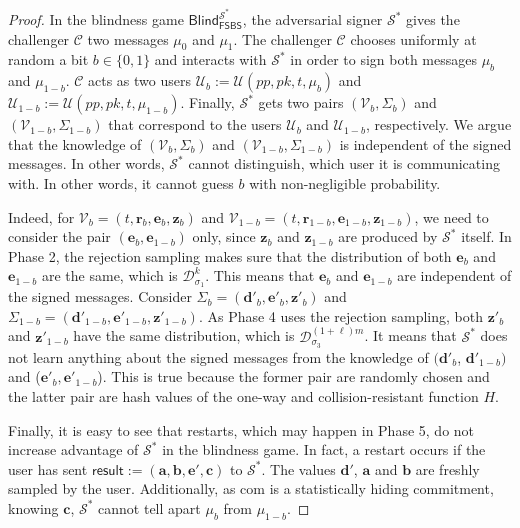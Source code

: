 \documentclass[runningheads]{llncs}
\def\bf{\mathbf}
\begin{document}
\begin{proof} 
In the blindness game $\textsf{Blind}_{\textsf{FSBS}}^{\mathcal{S}^*}$, 
the adversarial signer $\mathcal{S}^*$ gives  the challenger $\mathcal{C}$ two messages $\mu_0$ and  $\mu_1$. 
The challenger $\mathcal{C}$ chooses uniformly at random a bit $b \in \{0, 1\}$ and 
interacts with $\mathcal{S}^*$ in order to sign both messages $\mu_b$ and $\mu_{1-b}$. 
$\mathcal{C}$ acts as two users $\mathcal{U}_b:=\mathcal{U}(pp, pk,t, \mu_b)$ 
and $\mathcal{U}_{1-b}:=\mathcal{U}(pp, pk,t, \mu_{1-b})$. 
Finally, $\mathcal{S}^*$ gets
two pairs $(\mathcal{V}_b,\Sigma_b)$ and $(\mathcal{V}_{1-b},\Sigma_{1-b})$
that correspond to the users $\mathcal{U}_b$ and $\mathcal{U}_{1-b}$, respectively.
We argue that the knowledge of $(\mathcal{V}_b,\Sigma_b)$ and $(\mathcal{V}_{1-b},\Sigma_{1-b})$ 
is independent of the signed messages. 
In other words, $\mathcal{S}^*$  
cannot distinguish,  which user it is communicating with. 
In other words, it cannot guess $b$ with non-negligible probability.

Indeed, for $\mathcal{V}_b=(t, \mathbf{r}_b,\mathbf{e}_b, \mathbf{z}_b)$ and 
$\mathcal{V}_{1-b}=(t, \mathbf{r}_{1-b},\mathbf{e}_{1-b}, \mathbf{z}_{1-b})$, 
we need to consider the pair $(\mathbf{e}_b,\mathbf{e}_{1-b})$ only, 
since  $ \mathbf{z}_b$ and  $\mathbf{z}_{1-b}$ are produced by $\mathcal{S}^*$ itself. 
In Phase 2, the rejection sampling  makes sure  that the distribution of 
both $\mathbf{e}_b$ and $\mathbf{e}_{1-b}$ are the same, which is $\mathcal{D}_{\sigma_1}^k$. 
This means that  $\mathbf{e}_b$ and $\mathbf{e}_{1-b}$ are independent of the signed messages. 	
Consider $\Sigma_b=(\mathbf{d}'_b,\mathbf{e}'_b, \mathbf{z}'_b)$ and
$\Sigma_{1-b}=(\mathbf{d}'_{1-b},\mathbf{e}'_{1-b}, \mathbf{z}'_{1-b})$.
As Phase 4 uses the rejection sampling,  both $\mathbf{z}'_{b}$ and $\mathbf{z}'_{1-b}$ 
have the same distribution, which is $\mathcal{D}_{\sigma_3}^{(1+\ell)m}$. 
It means that $\mathcal{S}^*$ does not learn anything about the signed messages
from the knowledge of $(\mathbf{d}'_b$, $\mathbf{d}'_{1-b})$ and ($\mathbf{e}'_b , \mathbf{e}'_{1-b}$). 
This is true because 
the former pair are randomly chosen and the latter pair are hash values of the one-way and collision-resistant function $H$.
	
Finally, it is easy to see that restarts, which may happen in Phase 5,
do not increase advantage of $\mathcal{S}^*$ in the blindness game. 
In fact, a restart occurs if the user has sent 
$\textsf{result}:= (\mathbf{a}, \mathbf{b}, \mathbf{e}', \bf{c})$ to $\mathcal{S}^*$.  
The values $\mathbf{d}'$, $\mathbf{a}$ and $\mathbf{b}$ are freshly sampled by the user. 
 Additionally, as \textsf{com} is a statistically hiding commitment, knowing $\bf{c}$,
 $\mathcal{S}^*$ cannot tell apart $\mu_b$ from $\mu_{1-b}$.
\end{proof}
\end{document}
